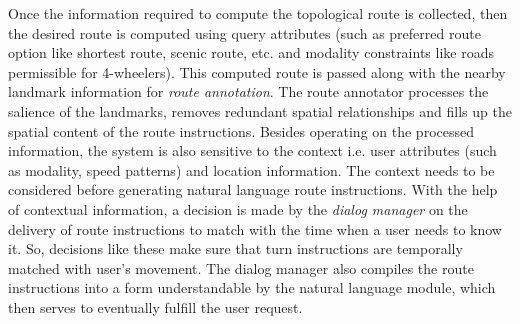 \documentclass{iitkthesis}
\begin{document}
Once the information required to compute the topological route is collected, then the desired route is computed using query attributes (such as preferred route option like shortest route, scenic route, etc. and modality constraints like roads permissible for 4-wheelers). This computed route is passed along with the nearby landmark information for \textit{route annotation}. The route annotator processes the salience of the landmarks, removes redundant spatial relationships and fills up the spatial content of the route instructions. Besides operating on the processed information, the system is also sensitive to the context i.e. user attributes (such as modality, speed patterns) and location information. The context needs to be considered before generating natural language route instructions. With the help of contextual information, a decision is made by the \textit{dialog manager} on the delivery of route instructions to match with the time when a user needs to know it. So, decisions like these make sure that turn instructions are temporally matched with user's movement. The dialog manager also compiles the route instructions into a form understandable by the natural language module, which then serves to eventually fulfill the user request.
\end{document}
